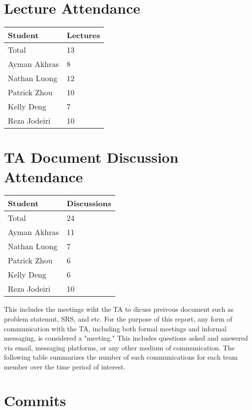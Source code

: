 \documentclass{article}
\begin{document}
\section{Lecture Attendance}

\begin{table}[H]
\centering
\begin{tabular}{ll}
\toprule
\textbf{Student} & \textbf{Lectures}\\
\midrule
Total & 13\\
Ayman Akhras & 8\\
Nathan Luong & 12\\
Patrick Zhou & 10\\
Kelly Deng & 7\\
Reza Jodeiri & 10\\
\bottomrule
\end{tabular}
\end{table}


\section{TA Document Discussion Attendance}

\begin{table}[H]
\centering
\begin{tabular}{ll}
\toprule
\textbf{Student} & \textbf{Discussions}\\
\midrule
Total & 24\\
Ayman Akhras & 11\\
Nathan Luong & 7\\
Patrick Zhou & 6\\
Kelly Deng & 6\\
Reza Jodeiri & 10\\
\bottomrule
\end{tabular}
\end{table}

This includes the meetings wiht the TA to dicuss preivous document such as problem statemnt, SRS, and etc.
For the purpose of this report, any form of communication with the TA, including both formal meetings and informal messaging, is considered a "meeting." This includes questions asked and answered via email, messaging platforms, or any other medium of communication. The following table summarizes the number of such communications for each team member over the time period of interest.

\section{Commits}
\end{document}
